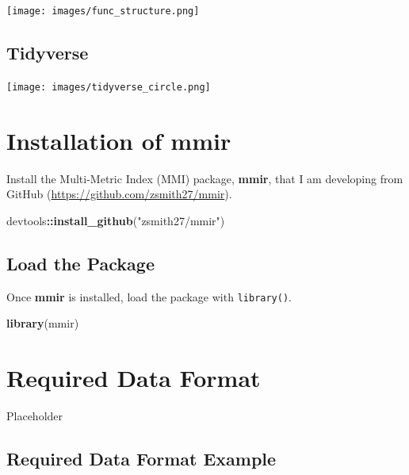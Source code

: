 \documentclass[
]{book}
\newenvironment{Shaded}{\begin{snugshade}}{\end{snugshade}}
\newcommand{\KeywordTok}[1]{\textcolor[rgb]{0.13,0.29,0.53}{\textbf{#1}}}
\newcommand{\NormalTok}[1]{#1}
\newcommand{\OperatorTok}[1]{\textcolor[rgb]{0.81,0.36,0.00}{\textbf{#1}}}
\newcommand{\StringTok}[1]{\textcolor[rgb]{0.31,0.60,0.02}{#1}}
\begin{document}
\texttt{[image: images/func\_structure.png]}

\hypertarget{tidyverse}{%
\section{Tidyverse}\label{tidyverse}}

\texttt{[image: images/tidyverse\_circle.png]}

\hypertarget{installation-of-mmir}{%
\chapter{Installation of mmir}\label{installation-of-mmir}}

Install the Multi-Metric Index (MMI) package, \textbf{mmir}, that I am developing from GitHub (\url{https://github.com/zsmith27/mmir}).

\begin{Shaded}
\begin{Highlighting}[]
\NormalTok{devtools}\OperatorTok{::}\KeywordTok{install_github}\NormalTok{(}\StringTok{"zsmith27/mmir"}\NormalTok{)}
\end{Highlighting}
\end{Shaded}

\hypertarget{load-the-package}{%
\section{Load the Package}\label{load-the-package}}

Once \textbf{mmir} is installed, load the package with \texttt{library()}.

\begin{Shaded}
\begin{Highlighting}[]
\KeywordTok{library}\NormalTok{(mmir)}
\end{Highlighting}
\end{Shaded}

\hypertarget{required-data-format}{%
\chapter{Required Data Format}\label{required-data-format}}

Placeholder

\hypertarget{required-data-format-example}{%
\section{Required Data Format Example}\label{required-data-format-example}}
\end{document}
